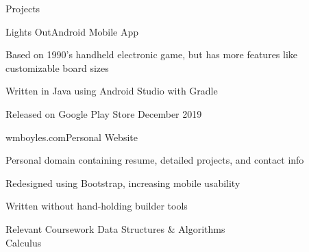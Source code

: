 \documentclass{resume} %
\begin{document}
\begin{rSection}{Projects}

	\begin{rSubsection}{Lights Out}{Android Mobile App}{}{}
		\item Based on 1990's handheld electronic game, but has more features like customizable board sizes
		\item Written in Java using Android Studio with Gradle
		\item Released on Google Play Store December 2019
	\end{rSubsection}
	
	\begin{rSubsection}{wmboyles.com}{Personal Website}{}{}
		\item Personal domain containing resume, detailed projects, and contact info
		\item Redesigned using Bootstrap, increasing mobile usability
		\item Written without hand-holding builder tools
	\end{rSubsection}
	
\end{rSection}


\begin{rSection}{Relevant Coursework}
	{Data Structures \& Algorithms}
	 \\
	{Calculus}
\end{rSection}
\end{document}
